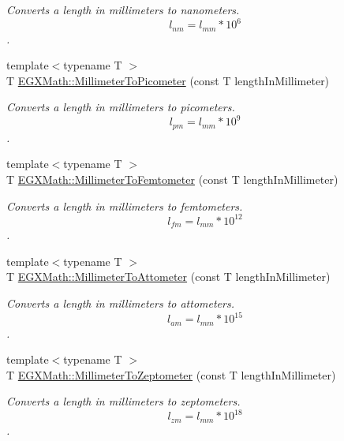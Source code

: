 \begin{DoxyCompactItemize}
\begin{DoxyCompactList}\small\item\em Converts a length in millimeters to nanometers. \[ l_{nm}=l_{mm} * 10^{6} \]. \end{DoxyCompactList}\item 
{\footnotesize template$<$typename T $>$ }\\T \mbox{\hyperlink{group___e_g_x_math-_conversions-_length_conversions-_s_i-_millimeter-_s_i_ga679e3714c229f1355a5c9bf707fcd723}{E\+G\+X\+Math\+::\+Millimeter\+To\+Picometer}} (const T length\+In\+Millimeter)
\begin{DoxyCompactList}\small\item\em Converts a length in millimeters to picometers. \[ l_{pm}=l_{mm} * 10^{9} \]. \end{DoxyCompactList}\item 
{\footnotesize template$<$typename T $>$ }\\T \mbox{\hyperlink{group___e_g_x_math-_conversions-_length_conversions-_s_i-_millimeter-_s_i_gaa6dd55424b685e10484ca46e394b2e92}{E\+G\+X\+Math\+::\+Millimeter\+To\+Femtometer}} (const T length\+In\+Millimeter)
\begin{DoxyCompactList}\small\item\em Converts a length in millimeters to femtometers. \[ l_{fm}=l_{mm} * 10^{12} \]. \end{DoxyCompactList}\item 
{\footnotesize template$<$typename T $>$ }\\T \mbox{\hyperlink{group___e_g_x_math-_conversions-_length_conversions-_s_i-_millimeter-_s_i_ga4403d88c0af8819b1d6e70057a1457b3}{E\+G\+X\+Math\+::\+Millimeter\+To\+Attometer}} (const T length\+In\+Millimeter)
\begin{DoxyCompactList}\small\item\em Converts a length in millimeters to attometers. \[ l_{am}=l_{mm} * 10^{15} \]. \end{DoxyCompactList}\item 
{\footnotesize template$<$typename T $>$ }\\T \mbox{\hyperlink{group___e_g_x_math-_conversions-_length_conversions-_s_i-_millimeter-_s_i_ga7973ce559c88b84035d9653e26e4464c}{E\+G\+X\+Math\+::\+Millimeter\+To\+Zeptometer}} (const T length\+In\+Millimeter)
\begin{DoxyCompactList}\small\item\em Converts a length in millimeters to zeptometers. \[ l_{zm}=l_{mm} * 10^{18} \]. \end{DoxyCompactList}\item 

\end{DoxyCompactItemize}
